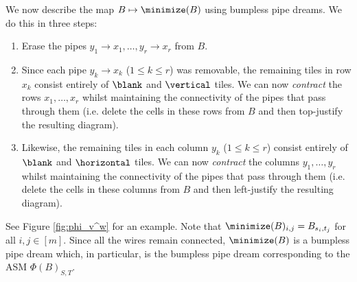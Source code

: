 We now describe the map $B\mapsto \minimize(B)$ using bumpless pipe dreams.
We do this in three steps:
\begin{enumerate}
    \item Erase the pipes $y_1\to x_1,\dots,y_r\to x_r$ from $B$.
    \item Since each pipe $y_k\to x_k$ ($1\leq k\leq r$) was removable, the remaining tiles in row $x_k$ consist entirely of $\blank$ and $\vertical$ tiles.
    We can now \textit{contract} the rows $x_1,\dots,x_r$ whilst maintaining the connectivity of the pipes that pass through them
    (i.e. delete the cells in these rows from $B$ and then top-justify the resulting diagram).
    \item Likewise, the remaining tiles in each column $y_k$ ($1\leq k\leq r$) consist entirely of $\blank$ and $\horizontal$ tiles.
    We can now \textit{contract} the columns $y_1,\dots,y_r$ whilst maintaining the connectivity of the pipes that pass through them
    (i.e. delete the cells in these columns from $B$ and then left-justify the resulting diagram).
\end{enumerate}
See Figure \ref{fig:phi_v^w} for an example.
Note that $\minimize(B)_{i,j} = B_{s_i,t_j}$ for all $i,j\in[m]$.
Since all the wires remain connected, $\minimize(B)$ is a bumpless pipe dream which, in particular, is the bumpless pipe dream corresponding to the ASM $\Phi(B)_{S,T}$.

